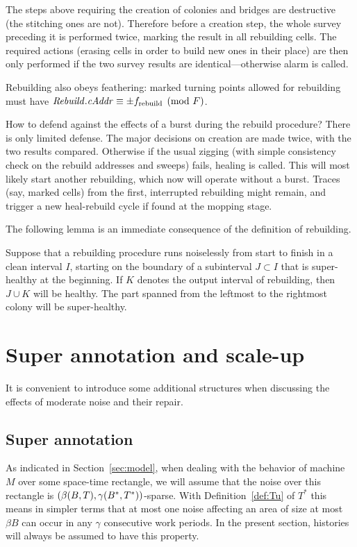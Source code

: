 \documentclass[12pt]{memoir}
\newcommand{\fld}[1]{\ensuremath{\textit{#1\/}}}
\newcommand{\tRebuild}{f_{\mathrm{rebuild}}}
\def\B{B}
\newcommand{\Tu}{T}
\newcommand{\F}{F}
\newcommand{\cAddr}{\fld{cAddr}}
\newcommand{\Rebuild}{\fld{Rebuild}}
\begin{document}
The steps above requiring the creation of colonies and bridges are destructive
(the stitching ones are not).
Therefore before a creation step, the whole survey preceding it is performed twice, 
marking the result in all rebuilding cells.
The required actions (erasing cells in order to build new ones in their place)
are then only performed if the two survey results are identical---otherwise alarm is called.

Rebuilding also obeys feathering: marked turning points allowed for 
rebuilding must have \( \Rebuild.\cAddr\equiv\pm \tRebuild\pmod{\F} \).

How to defend against the effects of a burst during the rebuild procedure?
There is only limited defense.
The major decisions on creation are made twice, with the two results compared.
Otherwise if the usual zigging (with simple consistency check on the rebuild addresses
and sweeps) fails, healing is called.
This will most likely start another rebuilding, which now will operate without a burst.
Traces (say, marked cells) from the first, interrupted rebuilding might remain, and trigger a new
heal-rebuild cycle if found at the mopping stage.

The following lemma is an immediate consequence of the definition of rebuilding.

\begin{lemma}\label{lem:rebuild-health}
Suppose that a rebuilding procedure runs noiselessly from start to finish in a clean interval \( I \),
starting on the boundary of a subinterval \( J\subset I \) that is super-healthy at the beginning.
If \( K \) denotes the output interval of rebuilding, then \( J\cup K \) will be healthy.
The part spanned from the leftmost to the rightmost colony will be super-healthy.
\end{lemma}

\section{Super annotation and scale-up}

It is convenient to introduce some additional structures when discussing
the effects of moderate noise and their repair.

\subsection{Super annotation}\label{sec:annotation}

As indicated in Section~\ref{sec:model}, when dealing with the behavior
of machine \( M \) over some space-time rectangle, we will assume that the noise
over this rectangle is \( (\beta\pair{\B}{\Tu}, \gamma\pair{\B^{*}}{\Tu^{*}}) \)-sparse.
With Definition~\ref{def:Tu} of \( \Tu^{*} \) this means 
in simpler terms that at most one noise  affecting an
area of size at most \( \beta\B \) can occur in any \( \gamma \) consecutive work periods.
In the present section, histories will always be assumed to have this property.
\end{document}
